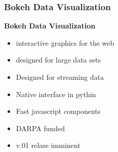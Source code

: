 \documentclass[MASTER.tex]{subfiles}
\begin{document}
\begin{frame}
	\frametitle{Bokeh Data Visualization}
	\textbf{Bokeh Data Visualization}
	\begin{itemize}
		\item interactive graphics for the web
		\item designed for large data sets
		\item Designed for streaming data
		\item Native interface in pythin
		\item Fast javascript components
		\item DARPA funded
		\item v.01 relase imminent
	\end{itemize}
	
\end{frame}
\end{document}
